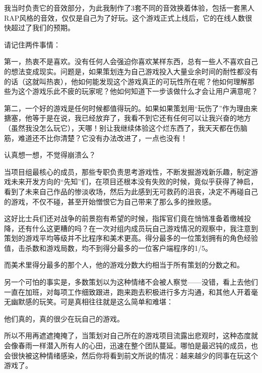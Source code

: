 \documentclass{article}
\begin{document}
我当时负责它的音效部分，为此我制作了3套不同的音效换着体验，包括一套黑人RAP风格的音效，仅仅是自己为了好玩。这个游戏正式上线后，它的在线人数很快超过了我们的预期。



请记住两件事情：



第一，热衷不是喜欢。没有任何人会强迫你喜欢某样东西，总有一些人不喜欢自己的想法变成现实。问题是，如果策划连为自己游戏投入大量业余时间的耐性都没有的话（这就叫热衷），他如何能发现这个游戏真正的可玩性所在呢？他如何理解那些为这个游戏乐此不疲的玩家呢？他如何知道下一步该做什么才会让用户满意呢？



第二，一个好的游戏是任何时候都值得玩的。如果如果策划用“玩伤了”作为理由来搪塞，他等于是在说，我已经放弃了，我看不到它还有任何可以让我兴奋的地方（虽然我没怎么玩它），天哪！别让我继续体验这个烂东西了，我天天都在伤脑筋，难道还不比你清楚？它没有办法改进了，一点也没有！



认真想一想，不觉得崩溃么？



当项目组最核心的成员，那些专职负责思考游戏性，不断发掘游戏新乐趣，制定游戏未来开发方向的“先知”们，在项目还根本没有失败的时候，竟似乎获得了神启，看到了未来自己作品的惨淡收场，然后为此感到无可救药的沮丧，决定不再碰自己的游戏，不仅不碰，甚至开始憎恨它为自己带来了那么多的挫败感。



这好比士兵们还对战争的前景抱有希望的时候，指挥官们竟在悄悄准备着缴械投降，还有什么这更糟的吗？在一次对组内成员玩自己游戏情况的观察中，我注意到策划的游戏平均等级并不比程序和美术更高。得分最多的一位策划拥有的角色经验值，击杀数和游戏局数，均不到得分最多的一位客户端程序的1/5。



而美术里得分最多的那个人，他的游戏分数大约相当于所有策划的分数之和。



另一个可怕的事实是，多数策划以为这种情绪不会被人察觉——没错，看上去他们一直在加班，对每项工作细致跟进，跑来跑去积极进行多方沟通，和其他人开着毫无幽默感的玩笑。可是真相往往就是这么简单和难堪：



他们真的，真的很少在玩自己的游戏。



所以不用再遮遮掩掩了，当策划对自己所在的游戏项目流露出悲观时，这种态度就会像春雨一样潜入所有人的心田，迅速在整个团队蔓延。哪怕是最迟钝的成员，也会很快被这种情绪感染，然后你将看到前文所说的情况：越来越少的同事在玩这个游戏了。
\end{document}
